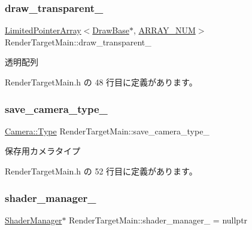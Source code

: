 \subsubsection{\texorpdfstring{draw\+\_\+transparent\+\_\+}{draw\_transparent\_}}
{\footnotesize\ttfamily \mbox{\hyperlink{class_limited_pointer_array}{Limited\+Pointer\+Array}}$<$\mbox{\hyperlink{class_draw_base}{Draw\+Base}}$\ast$, \mbox{\hyperlink{class_render_target_main_ad677e34abb5ef7673d8ab52f47d8729e}{A\+R\+R\+A\+Y\+\_\+\+N\+UM}}$>$ Render\+Target\+Main\+::draw\+\_\+transparent\+\_\+\hspace{0.3cm}{\ttfamily [private]}}



透明配列 



 Render\+Target\+Main.\+h の 48 行目に定義があります。

\mbox{\label{class_render_target_main_aa30119cd9eafbd7fb3a6a47cad4a6b45}} 
\subsubsection{\texorpdfstring{save\+\_\+camera\+\_\+type\+\_\+}{save\_camera\_type\_}}
{\footnotesize\ttfamily \mbox{\hyperlink{class_camera_a3b0a1f58deca679ac665f61c480d1dcb}{Camera\+::\+Type}} Render\+Target\+Main\+::save\+\_\+camera\+\_\+type\+\_\+\hspace{0.3cm}{\ttfamily [private]}}



保存用カメラタイプ 



 Render\+Target\+Main.\+h の 52 行目に定義があります。

\mbox{\label{class_render_target_main_a49a932fb4dc3b63a0d84b7fc324a7268}} 
\subsubsection{\texorpdfstring{shader\+\_\+manager\+\_\+}{shader\_manager\_}}
{\footnotesize\ttfamily \mbox{\hyperlink{class_shader_manager}{Shader\+Manager}}$\ast$ Render\+Target\+Main\+::shader\+\_\+manager\+\_\+ = nullptr\hspace{0.3cm}{\ttfamily [private]}}



